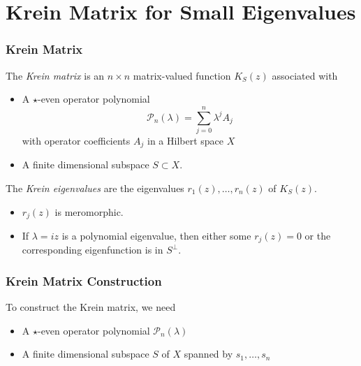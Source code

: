 \documentclass[16pt]{beamer}
\newcommand{\calP}{\mathcal{P}}
\begin{document}
\section{Krein Matrix for Small Eigenvalues}

\begin{frame}
\frametitle{Krein Matrix}
\begin{definition}[Kapitula et al., 2019]
    The \emph{Krein matrix} is an $n \times n$ matrix-valued function $K_S(z)$ associated with 
    \begin{itemize}
    	\item A $\star$-even operator polynomial 
    	\[
    	\calP_n(\lambda) = \sum_{j=0}^n \lambda^j A_j
    	\] 
    	with operator coefficients $A_j$ in a Hilbert space $X$
    	\item A finite dimensional subspace $S \subset X$.
    \end{itemize}

    The \emph{Krein eigenvalues} are the eigenvalues $r_1(z), \dots, r_n(z)$ of $K_S(z)$.
    \begin{itemize}
      \item $r_j(z)$ is meromorphic.
      \item If $\lambda = iz$ is a polynomial eigenvalue, then 
      either some $r_j(z) = 0$ or the corresponding eigenfunction is in $S^\perp$.
    \end{itemize}
\end{definition}
\end{frame}

\begin{frame}
\frametitle{Krein Matrix Construction}
	To construct the Krein matrix, we need
	\begin{itemize}
		\item A $\star$-even operator polynomial $\calP_n(\lambda)$
		\item A finite dimensional subspace $S$ of $X$ spanned by $s_1, \dots, s_n$
	\end{itemize}
\end{frame}
\end{document}

